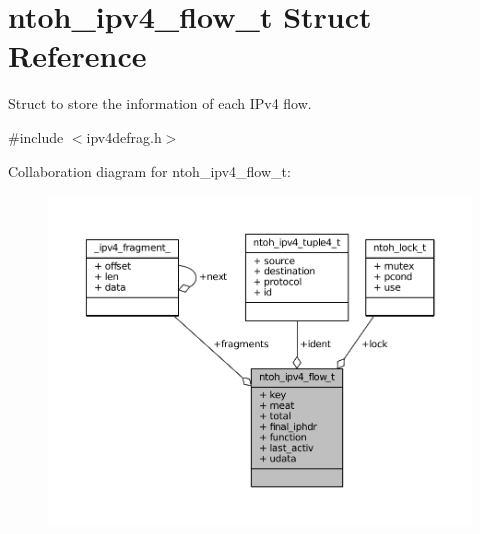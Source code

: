 \hypertarget{structntoh__ipv4__flow__t}{\section{ntoh\-\_\-ipv4\-\_\-flow\-\_\-t Struct Reference}
\label{structntoh__ipv4__flow__t}
}


Struct to store the information of each I\-Pv4 flow.  




{\ttfamily \#include $<$ipv4defrag.\-h$>$}



Collaboration diagram for ntoh\-\_\-ipv4\-\_\-flow\-\_\-t\-:
\nopagebreak
\begin{figure}[H]
\begin{center}
\leavevmode
\includegraphics[width=350pt]{structntoh__ipv4__flow__t__coll__graph}
\end{center}
\end{figure}
